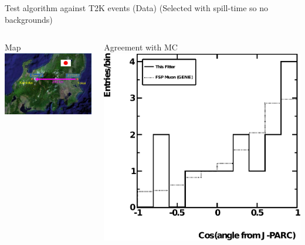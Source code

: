 \documentclass[14pt]{beamer}
\begin{document}
\begin{frame}{Test algorithm against T2K events (Data)}
	{\small(Selected with spill-time so no backgrounds)}
	\begin{columns}[T]
		\begin{block}{\centering\small{Map}}
			\vspace{10mm}
			\includegraphics[width=\linewidth]{t2k.jpeg}
		\end{block}
		\begin{block}{\centering\small{Agreement with MC}}
			\vspace{10mm}
			\includegraphics[width=\linewidth]{analyzed_rtq_t2k_nu_t2kReconDir_hist.pdf}
		\end{block}
	\end{columns}
\end{frame}
\end{document}
